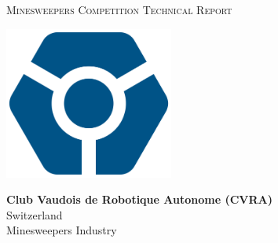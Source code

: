 \begin{titlepage}
\begin{center}

\vspace{1cm}

\Huge{\textsc{Minesweepers Competition Technical Report}}


\vfill{}
\includegraphics[height=5cm]{emblem}
\vspace{2cm}

\large{\textbf{Club Vaudois de Robotique Autonome (CVRA)}}\\
Switzerland\\
Minesweepers Industry

\vspace{2cm}

\begin{abstract}
    
\end{abstract}

\end{center}
\end{titlepage}
